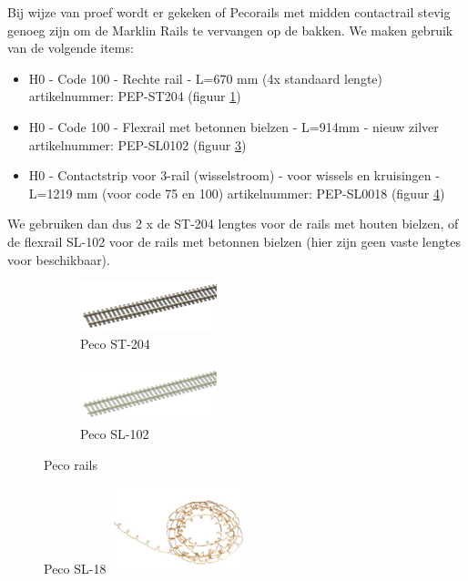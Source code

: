 \documentclass[12pt,a4paper]{report}
\begin{document}
Bij wijze van proef wordt er gekeken of Pecorails met midden contactrail stevig genoeg zijn om de Marklin Rails te vervangen op de bakken. We maken gebruik van de volgende items:

\begin{itemize}
\item H0 - Code 100 - Rechte rail - L=670 mm (4x standaard lengte) artikelnummer: PEP-ST204 (figuur \ref{pecost204})
\item H0 - Code 100 - Flexrail met betonnen bielzen - L=914mm - nieuw zilver artikelnummer: PEP-SL0102 (figuur \ref{pecosl102})
\item H0 - Contactstrip voor 3-rail (wisselstroom) - voor wissels en kruisingen - L=1219 mm (voor code 75 en 100) artikelnummer: PEP-SL0018 (figuur \ref{pecosl18})
\end{itemize}

We gebruiken dan dus 2 x de ST-204 lengtes voor de rails met houten bielzen, of de flexrail SL-102 voor de rails met betonnen bielzen (hier zijn geen vaste lengtes voor beschikbaar).

\begin{figure}
\centering
\begin{subfigure}{.5\textwidth}
  \includegraphics[scale=1.0]{images/rcu_peco_st204}
  \caption{Peco ST-204\label{pecost204}}
\end{subfigure}%
\begin{subfigure}{.5\textwidth}
  \includegraphics[scale=1.0]{images/rcu_peco_sl102}
  \caption{Peco SL-102\label{pecosl102}}
\end{subfigure}
\caption{Peco rails}
\end{figure}

\begin{figure}[!ht]
  \captionbox
  {Peco SL-18\label{pecosl18}}
  {\includegraphics[scale=1.0]{images/rcu_peco_sl18}}
\end{figure}
\end{document}
